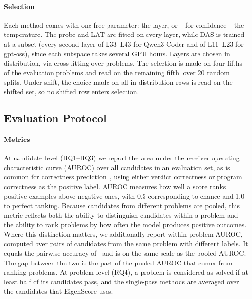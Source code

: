 \paragraph{Selection}
Each method comes with one free parameter: the layer, or --
for confidence -- the temperature. The probe and LAT are fitted on every layer, while DAS
is trained at a subset (every second layer of L33--L43 for Qwen3-Coder and of L11--L23 for gpt-oss), since each subspace takes several GPU hours.
Layers are chosen in distribution, via cross-fitting over problems.
The selection is made on four fifths of the evaluation problems and read on the
remaining fifth, over 20 random splits. Under shift, the choice made on all
in-distribution rows is read on the shifted set, so no shifted row enters
selection. %

\subsection{Evaluation Protocol}
\label{sec:setup-protocol}
\paragraph{Metrics}

At candidate level (RQ1--RQ3) we report the area under the receiver operating characteristic curve (AUROC)
over all candidates in an evaluation set, as is common for correctness prediction~\cite{he2026usingsemanticdistanceestimate,he2026codecircuit,bouchard2026functional,shi2026codemorethantext}, using either verdict correctness or program correctness as the positive label. AUROC measures how well a score ranks positive examples above negative ones, with 0.5 corresponding to chance and 1.0 to perfect ranking.
Because candidates from different problems are pooled, this metric reflects both the ability to distinguish candidates within a problem and the ability to rank problems by how often the model produces positive outcomes. Where this distinction matters, we additionally report within-problem AUROC, computed over pairs of candidates from the same problem with different labels. It equals the pairwise accuracy of~\cite{ribeiro2026robustness} and is on the same scale as the pooled AUROC.
The gap between the two is the part of the pooled AUROC that comes from ranking problems.
At problem level (RQ4), a problem is
considered as solved if at least half of its candidates pass, and the
single-pass methods are averaged over the candidates that EigenScore uses.

